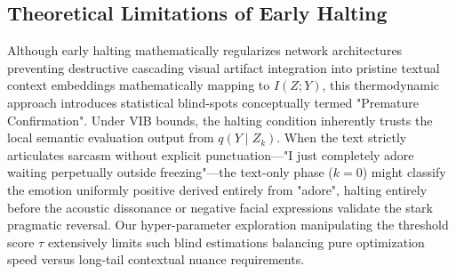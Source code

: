 \documentclass[11pt]{article}
\begin{document}
\begin{table}[h]
  \caption{\label{tab:dataset_stats} Statistical breakdown distinguishing training, validation, and testing sample sizes across the four primarily evaluated multimodal datasets. Sentences represent total unique utterances processed.}
  \centering
\end{table}

\subsection{Theoretical Limitations of Early Halting}
Although early halting mathematically regularizes network architectures preventing destructive cascading visual artifact integration into pristine textual context embeddings mathematically mapping to $I(Z; Y)$, this thermodynamic approach introduces statistical blind-spots conceptually termed "Premature Confirmation". Under VIB bounds, the halting condition inherently trusts the local semantic evaluation output from $q(Y \mid Z_k)$. When the text strictly articulates sarcasm without explicit punctuation—"I just completely adore waiting perpetually outside freezing"—the text-only phase ($k=0$) might classify the emotion uniformly positive derived entirely from "adore", halting entirely before the acoustic dissonance or negative facial expressions validate the stark pragmatic reversal. Our hyper-parameter exploration manipulating the threshold score $\tau$ extensively limits such blind estimations balancing pure optimization speed versus long-tail contextual nuance requirements.
\end{document}
